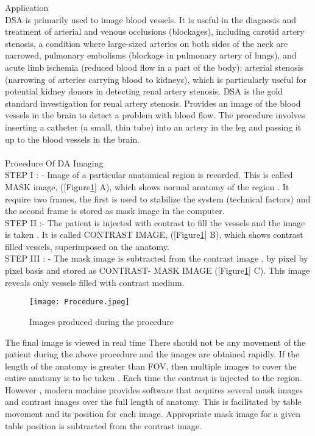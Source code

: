 \documentclass[12pt]{article}
\begin{document}
Application\\
DSA is primarily used to image blood vessels. It is useful in the diagnosis and treatment of arterial and venous occlusions (blockages), including carotid artery stenosis, a condition where large-sized arteries on both sides of the neck are narrowed, pulmonary embolisms (blockage in pulmonary artery of lungs), and acute limb ischemia (reduced blood flow in a part of the body); arterial stenosis (narrowing of arteries carrying blood to kidneys), which is particularly useful for potential kidney donors in detecting renal artery stenosis. DSA is the gold standard investigation for renal artery stenosis.
Provides an image of the blood vessels in the brain to detect a problem with blood flow. The procedure involves inserting a catheter (a small, thin tube) into an artery in the leg and passing it up to the blood vessels in the brain.\\\\

Procedure Of DA Imaging\\

STEP I : - Image of a particular anatomical region is recorded. This is called MASK image, ([Figure\ref{fig_procedure}] A), which shows normal anatomy of the region . It require two frames, the first is used to stabilize the system (technical factors) and the second frame is stored as mask image in the computer.\\

STEP II :- The patient is injected with contrast to fill the vessels and the image is taken . It is called CONTRAST IMAGE, ([Figure\ref{fig_procedure}] B), which shows contrast filled vessels, superimposed on the anatomy.\\

STEP III : - The mask image is subtracted from the contrast image , by pixel by pixel basis and stored as CONTRAST- MASK IMAGE ([Figure\ref{fig_procedure}] C). This image reveals only vessels filled with contrast medium.\\


\begin{figure}[h]
\centering
\texttt{[image: Procedure.jpeg]}
\caption{Images produced during the procedure}
\label{fig_procedure}
\end{figure}

The final image is viewed in real time There should not be any movement of the patient during the above procedure and the images are obtained rapidly. If the length of the anatomy is greater than FOV, then multiple images to cover the entire anatomy is to be taken . Each time the contrast is injected to the region. However , modern machine provides software that acquires several mask images and contrast images over the full length of anatomy. This is facilitated by table movement  and its position for each image. Appropriate mask image for a given table position is subtracted from the contrast image.\\\\
\end{document}
